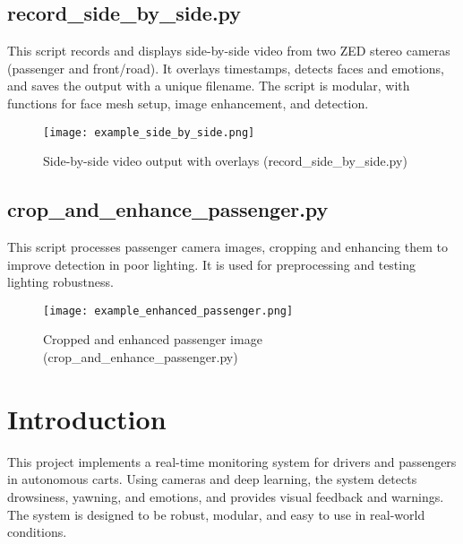\documentclass[12pt]{article}
\begin{document}
\subsection{record\_side\_by\_side.py}
This script records and displays side-by-side video from two ZED stereo cameras (passenger and front/road). It overlays timestamps, detects faces and emotions, and saves the output with a unique filename. The script is modular, with functions for face mesh setup, image enhancement, and detection.

\begin{figure}[h!]
    \centering
    \texttt{[image: example\_side\_by\_side.png]}
    \caption{Side-by-side video output with overlays (record\_side\_by\_side.py)}
\end{figure}

\subsection{crop\_and\_enhance\_passenger.py}
This script processes passenger camera images, cropping and enhancing them to improve detection in poor lighting. It is used for preprocessing and testing lighting robustness.


\begin{figure}[h!]
    \centering
    \texttt{[image: example\_enhanced\_passenger.png]}
    \caption{Cropped and enhanced passenger image (crop\_and\_enhance\_passenger.py)}
\end{figure}



\section{Introduction}
This project implements a real-time monitoring system for drivers and passengers in autonomous carts. Using cameras and deep learning, the system detects drowsiness, yawning, and emotions, and provides visual feedback and warnings. The system is designed to be robust, modular, and easy to use in real-world conditions.

\usetikzlibrary{shapes.geometric, arrows.meta}

\usetikzlibrary{matrix, positioning, arrows.meta}
\end{document}
